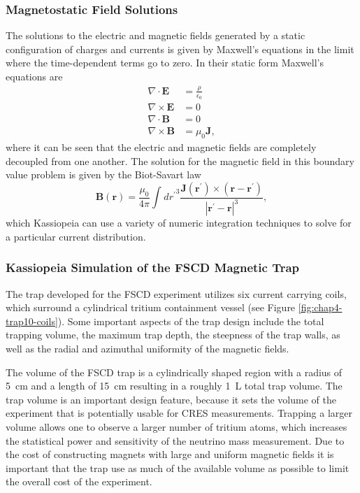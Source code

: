 \subsubsection*{Magnetostatic Field Solutions}

The solutions to the electric and magnetic fields generated by a static configuration of charges and currents is given by Maxwell's equations in the limit where the time-dependent terms go to zero. In their static form Maxwell's equations \cite{jackson_classical_1999} are
\begin{align}
    \nabla\cdot\mathbf{E}&=\frac{\rho}{\epsilon_0}\\
    \nabla\times\mathbf{E}&=0\\
    \nabla\cdot\mathbf{B}&=0\\
    \nabla\times\mathbf{B}&=\mu_0\mathbf{J},
\end{align}
where it can be seen that the electric and magnetic fields are completely decoupled from one another. The solution for the magnetic field in this boundary value problem is given by the Biot-Savart law
\begin{equation}
    \mathbf{B}(\mathbf{r}) = \frac{\mu_0}{4\pi}\int_{}^{}{d{r^{'}}^{3}\frac{\mathbf{J}(\mathbf{r}^{'})\times (\mathbf{r}-\mathbf{r}^{'})}{|\mathbf{r}^{'}-\mathbf{r}|^{3}}},
\end{equation}
which Kassiopeia can use a variety of numeric integration techniques to solve for a particular current distribution.

\subsubsection*{Kassiopeia Simulation of the FSCD Magnetic Trap}

The trap developed for the FSCD experiment utilizes six current carrying coils, which surround a cylindrical tritium containment vessel (see Figure \ref{fig:chap4-trap10-coils}). Some important aspects of the trap design include the total trapping volume, the maximum trap depth, the steepness of the trap walls, as well as the radial and azimuthal uniformity of the magnetic fields.

The volume of the FSCD trap is a cylindrically shaped region with a radius of 5~cm and a length of 15~cm resulting in a roughly 1~L total trap volume. The trap volume is an important design feature, because it sets the volume of the experiment that is potentially usable for CRES measurements. Trapping a larger volume allows one to observe a larger number of tritium atoms, which increases the statistical power and sensitivity of the neutrino mass measurement. Due to the cost of constructing magnets with large and uniform magnetic fields it is important that the trap use as much of the available volume as possible to limit the overall cost of the experiment.

